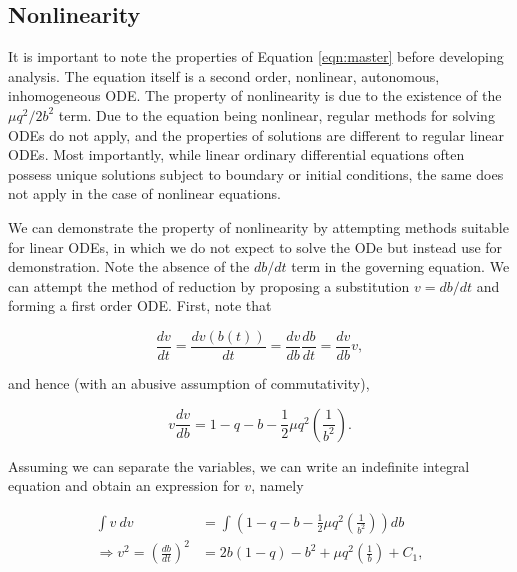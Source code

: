 \documentclass{article}
\begin{document}
\subsection{Nonlinearity}

It is important to note the properties of Equation \ref{eqn:master} before developing analysis.
The equation itself is a second order, nonlinear, autonomous, inhomogeneous ODE.
The property of nonlinearity is due to the existence of the $\mu q^2/2b^2$ term.
Due to the equation being nonlinear, regular methods for solving ODEs do not apply,
and the properties of solutions are different to regular linear ODEs.
Most importantly, while linear ordinary differential equations often possess unique solutions subject to boundary or initial conditions,
the same does not apply in the case of nonlinear equations.

We can demonstrate the property of nonlinearity by attempting methods suitable for linear ODEs,
in which we do not expect to solve the ODe but instead use for demonstration.
Note the absence of the $db/dt$ term in the governing equation.
We can attempt the method of reduction by proposing a substitution $v=db/dt$ and forming a first order ODE.
First, note that

\begin{equation}
    \frac{dv}{dt} = \frac{dv(b(t))}{dt} = \frac{dv}{db}\frac{db}{dt} = \frac{dv}{db}v,
\end{equation}

and hence (with an abusive assumption of commutativity),

\begin{equation}
    v \frac{dv}{db} = 1 - q - b - \frac{1}{2}\mu q^2\left( \frac{1}{b^2} \right).
\end{equation}

Assuming we can separate the variables, we can write an indefinite integral equation and obtain an expression for $v$, namely

\begin{equation}
    \begin{aligned}
        \int v~dv                                      & = \int \left(1 - q - b - \frac{1}{2}\mu q^2\left( \frac{1}{b^2} \right)\right) db \\
        \Rightarrow v^2 = \left(\frac{db}{dt}\right)^2 & = 2b(1-q) - b^2 + \mu q^2\left(\frac{1}{b}\right) + C_1,
    \end{aligned}
    \label{eqn:first_order_reduction}
\end{equation}
\end{document}
